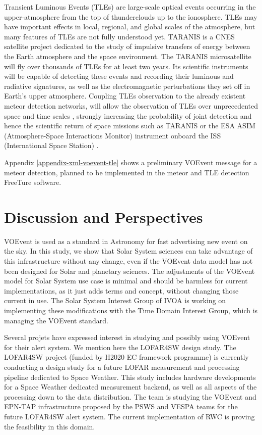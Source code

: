 \documentclass[referee,a4paper,12pt,traditabstract]{swsc}
\begin{document}
\begin{linenumbers}
Transient Luminous Events (TLEs) are large-scale optical events occurring in the upper-atmosphere from the top of thunderclouds up to the ionosphere. TLEs may have important effects in local, regional, and global scales of the atmosphere, but many features of TLEs are not fully understood yet. TARANIS is a CNES satellite project dedicated to the study of impulsive transfers of energy between the Earth atmosphere and the space environment. The TARANIS microsatellite will fly over thousands of TLEs for at least two years. Its scientific instruments will be capable of detecting these events and recording their luminous and radiative signatures, as well as the electromagnetic perturbations they set off in Earth's upper atmosphere. Coupling TLEs observation to the already existent meteor detection networks, will allow the observation of TLEs over unprecedented space and time scales \cite{2017AGUFMAE23A2469G}, strongly increasing the probability of joint detection and hence the scientific return of space missions such as TARANIS or the ESA ASIM (Atmosphere-Space Interactions Monitor) instrument onboard the ISS (International Space Station) \cite{2009AIPC.1118....8N}.

Appendix \ref{appendix-xml-voevent-tle} shows a preliminary VOEvent message for a meteor detection, planned to be implemented in the meteor and TLE detection FreeTure \cite{2014pim4.conf...39A} software. 

\section{Discussion and Perspectives}

VOEvent is used as a standard in Astronomy for fast advertising new event on the sky. In this study, we show that Solar System sciences can take advantage of this infrastructure without any change, even if the VOEvent data model has not been designed for Solar and planetary sciences. The adjustments of the VOEvent model for Solar System use case is minimal and should be harmless for current implementations, as it just adds terms and concept, without changing those current in use. The Solar System Interest Group of IVOA is working on implementing these modifications with the Time Domain Interest Group, which is managing the VOEvent standard. 

Several projets have expressed interest in studying and possibly using VOEvent for their alert system. We mention here the LOFAR4SW design study.
The LOFAR4SW project (funded by H2020 EC framework programme) is currently conducting a design study for a future LOFAR measurement and processing pipeline dedicated to Space Weather. This study includes hardware developments for a Space Weather dedicated measurement backend, as well as all aspects of the processing down to the data distribution. The team is studying the VOEvent and EPN-TAP infrastructure proposed by the PSWS and VESPA teams for the future LOFAR4SW alert system. The current implementation of RWC is proving the feasibility in this domain. 


\end{linenumbers}
\end{document}
